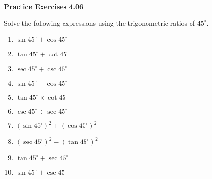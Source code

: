 \vspace{0.3ex}
\noindent\textbf{Practice Exercises 4.06}

\vspace{0.2ex}

Solve the following expressions using the trigonometric ratios of \( 45^\circ \).
\begin{multicols}{2}
\begin{enumerate}
    \item \( \sin 45^\circ + \cos 45^\circ \)
    \item \( \tan 45^\circ + \cot 45^\circ \)
    \item \( \sec 45^\circ + \csc 45^\circ \)
    \item \( \sin 45^\circ - \cos 45^\circ \)
    \item \( \tan 45^\circ \times \cot 45^\circ \)
    \item \( \csc 45^\circ \div \sec 45^\circ \)
    \item \( (\sin 45^\circ)^2 + (\cos 45^\circ)^2 \)
    \item \( (\sec 45^\circ)^2 - (\tan 45^\circ)^2 \)
    \item \( \tan 45^\circ + \sec 45^\circ \)
    \item \( \sin 45^\circ + \csc 45^\circ \)
\end{enumerate}
\end{multicols}
